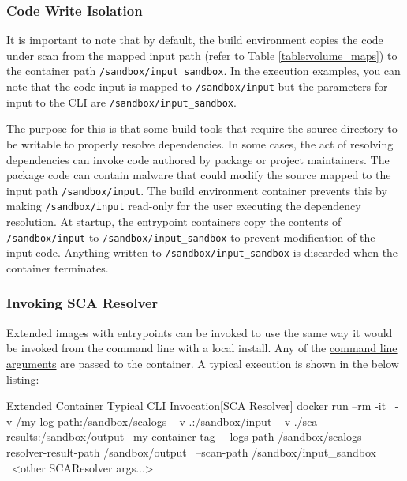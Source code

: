 \subsubsection{Code Write Isolation}

It is important to note that by default, the build environment copies the 
code under scan from the mapped input path (refer to Table \ref{table:volume_maps}) to the
container path \texttt{/sandbox/input\_sandbox}.  In the execution examples,
you can note that the code input is mapped to \texttt{/sandbox/input} but
the parameters for input to the CLI are \texttt{/sandbox/input\_sandbox}.

The purpose for this is that some build tools that require the source directory
to be writable to properly resolve dependencies.  In some cases, the act
of resolving dependencies can invoke code authored by package or project 
maintainers.  The package code can contain malware that could modify the
source mapped to the input path \texttt{/sandbox/input}.  The build environment
container prevents this by making \texttt{/sandbox/input} read-only for the
user executing the dependency resolution.  At startup, the entrypoint containers
copy the contents of \texttt{/sandbox/input} to \texttt{/sandbox/input\_sandbox}
to prevent modification of the input code.  Anything written to
\texttt{/sandbox/input\_sandbox} is discarded when the container terminates.



\subsubsection{Invoking SCA Resolver}

Extended images with entrypoints can be invoked to use \scaresolver the same way
it would be invoked from the command line with a local install.  Any of the 
\scaresolver
\href{https://checkmarx.com/resource/documents/en/34965-132888-checkmarx-sca-resolver-configuration-arguments.html}{command line arguments}
are passed to the container.  A typical execution is shown in the below listing:


\begin{code}{Extended Container Typical CLI Invocation}{[SCA Resolver]}{}
docker run --rm -it \
    -v /my-log-path:/sandbox/scalogs \
    -v .:/sandbox/input \
    -v ./sca-results:/sandbox/output \
    my-container-tag \
    --logs-path /sandbox/scalogs \
    --resolver-result-path /sandbox/output \
    --scan-path /sandbox/input_sandbox \ 
    <other SCAResolver args...>
\end{code}

